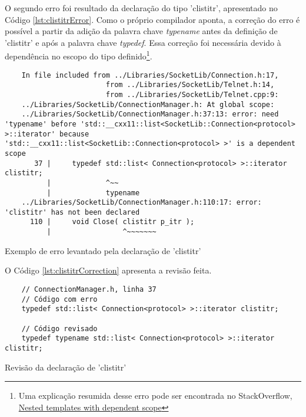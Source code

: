 O segundo erro foi resultado da declaração do tipo 'clistitr', apresentado no Código \ref{lst:clistitrError}. 
Como o próprio compilador aponta, a correção do erro é possível a partir da adição da 
palavra chave \textit{typename} antes da definição de 'clistitr' e após a palavra chave \textit{typedef}. 
Essa correção foi necessária devido à dependência no escopo do tipo definido\footnote{
    Uma explicação resumida desse erro pode ser encontrada no StackOverflow, \href{https://stackoverflow.com/questions/3311633/nested-templates-with-dependent-scope/3311640\#3311640}{Nested templates with dependent scope}
}.

\begin{listing}[!ht]
    \begin{verbatim}
    In file included from ../Libraries/SocketLib/Connection.h:17,
                        from ../Libraries/SocketLib/Telnet.h:14,
                        from ../Libraries/SocketLib/Telnet.cpp:9:
    ../Libraries/SocketLib/ConnectionManager.h: At global scope:
    ../Libraries/SocketLib/ConnectionManager.h:37:13: error: need 'typename' before 'std::__cxx11::list<SocketLib::Connection<protocol> >::iterator' because 'std::__cxx11::list<SocketLib::Connection<protocol> >' is a dependent scope
       37 |     typedef std::list< Connection<protocol> >::iterator clistitr;
          |             ^~~
          |             typename 
    ../Libraries/SocketLib/ConnectionManager.h:110:17: error: 'clistitr' has not been declared
      110 |     void Close( clistitr p_itr );
          |                 ^~~~~~~~
    \end{verbatim}
\caption{Exemplo de erro levantado pela declaração de 'clistitr'}
\label{lst:clistitrError}
\end{listing}

O Código \ref{lst:clistitrCorrection} apresenta a revisão feita.

\begin{listing}[!ht]
    \begin{verbatim}
    // ConnectionManager.h, linha 37
    // Código com erro
    typedef std::list< Connection<protocol> >::iterator clistitr;

    // Código revisado
    typedef typename std::list< Connection<protocol> >::iterator clistitr;
    \end{verbatim}
\caption{Revisão da declaração de 'clistitr'}
\label{lst:clistitrCorrection}
\end{listing}

